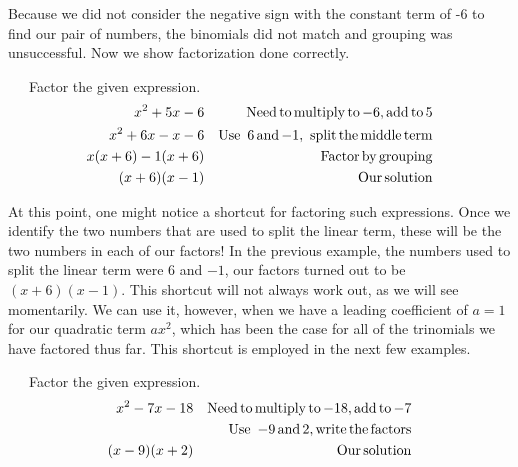 Because we did not consider the negative sign with the constant term of -6 to find our pair of
numbers, the binomials did not match and grouping was unsuccessful. Now we show factorization done correctly.\pp

\begin{example}~~~Factor the given expression.
  \begin{eqnarray*}
    x^2 + 5 x - 6 &  & \operatorname{Need} \operatorname{to} \operatorname{multiply} \operatorname{to} - 6,
    \operatorname{add} \operatorname{to} 5\\
    x^2 + 6 x - x - 6 &  & \operatorname{Use~} 6 \operatorname{and} - 1, \operatorname{~split} \operatorname{the}
    \operatorname{middle} \operatorname{term}\\
    x (x + 6) - 1 (x + 6) &  & \operatorname{Factor} \operatorname{by} \operatorname{grouping}\\
    (x + 6) (x - 1) &  & \operatorname{Our} \operatorname{solution}
  \end{eqnarray*}
\end{example}	
  

At this point, one might notice a shortcut for factoring such expressions. Once we identify
the two numbers that are used to split the linear term, these will be the two
numbers in each of our factors! In the previous example, the numbers used to split the
linear term were 6 and $- 1$, our factors turned out to be $(x + 6) (x - 1)$.\pp
This shortcut will not always work out, as we will see momentarily.  We can use it, however, when we have a leading coefficient of $a=1$ for our quadratic term $ax^2$, which has been the case for all of the trinomials we have factored thus far. This shortcut is employed in the next few examples.

\begin{example}~~~Factor the given expression.
  \begin{eqnarray*}
    x^2 - 7 x - 18 &  & \operatorname{Need} \operatorname{to} \operatorname{multiply} \operatorname{to} - 18,
    \operatorname{add} \operatorname{to} - 7\\
    &  & \operatorname{Use~} - 9 \operatorname{and} 2, \operatorname{write} \operatorname{the} \operatorname{factors}\\
    (x - 9) (x + 2) &  & \operatorname{Our} \operatorname{solution}
  \end{eqnarray*}
\end{example}	
  
\newpage

